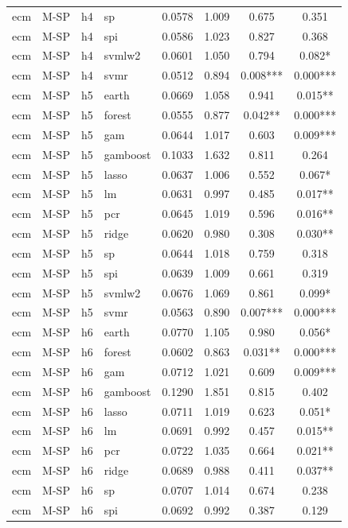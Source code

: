 \begin{ThreePartTable}
\begin{longtable}[t]{llclcccc}
ecm & M-SP & h4 & sp & 0.0578 & 1.009 & 0.675 & 0.351\\
ecm & M-SP & h4 & spi & 0.0586 & 1.023 & 0.827 & 0.368\\
ecm & M-SP & h4 & svmlw2 & 0.0601 & 1.050 & 0.794 & 0.082*\\
ecm & M-SP & h4 & svmr & 0.0512 & 0.894 & 0.008*** & 0.000***\\
\addlinespace
ecm & M-SP & h5 & earth & 0.0669 & 1.058 & 0.941 & 0.015**\\
ecm & M-SP & h5 & forest & 0.0555 & 0.877 & 0.042** & 0.000***\\
ecm & M-SP & h5 & gam & 0.0644 & 1.017 & 0.603 & 0.009***\\
ecm & M-SP & h5 & gamboost & 0.1033 & 1.632 & 0.811 & 0.264\\
ecm & M-SP & h5 & lasso & 0.0637 & 1.006 & 0.552 & 0.067*\\
ecm & M-SP & h5 & lm & 0.0631 & 0.997 & 0.485 & 0.017**\\
ecm & M-SP & h5 & pcr & 0.0645 & 1.019 & 0.596 & 0.016**\\
ecm & M-SP & h5 & ridge & 0.0620 & 0.980 & 0.308 & 0.030**\\
ecm & M-SP & h5 & sp & 0.0644 & 1.018 & 0.759 & 0.318\\
ecm & M-SP & h5 & spi & 0.0639 & 1.009 & 0.661 & 0.319\\
ecm & M-SP & h5 & svmlw2 & 0.0676 & 1.069 & 0.861 & 0.099*\\
ecm & M-SP & h5 & svmr & 0.0563 & 0.890 & 0.007*** & 0.000***\\
\addlinespace
ecm & M-SP & h6 & earth & 0.0770 & 1.105 & 0.980 & 0.056*\\
ecm & M-SP & h6 & forest & 0.0602 & 0.863 & 0.031** & 0.000***\\
ecm & M-SP & h6 & gam & 0.0712 & 1.021 & 0.609 & 0.009***\\
ecm & M-SP & h6 & gamboost & 0.1290 & 1.851 & 0.815 & 0.402\\
ecm & M-SP & h6 & lasso & 0.0711 & 1.019 & 0.623 & 0.051*\\
ecm & M-SP & h6 & lm & 0.0691 & 0.992 & 0.457 & 0.015**\\
ecm & M-SP & h6 & pcr & 0.0722 & 1.035 & 0.664 & 0.021**\\
ecm & M-SP & h6 & ridge & 0.0689 & 0.988 & 0.411 & 0.037**\\
ecm & M-SP & h6 & sp & 0.0707 & 1.014 & 0.674 & 0.238\\
ecm & M-SP & h6 & spi & 0.0692 & 0.992 & 0.387 & 0.129\\

\end{longtable}
\end{ThreePartTable}
